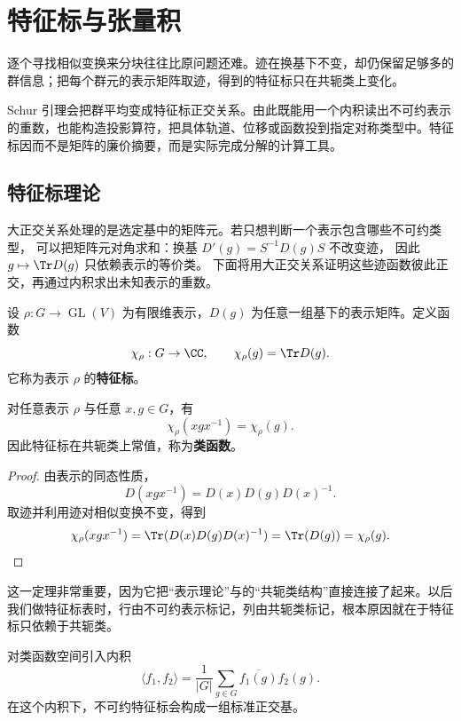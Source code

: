 \chapter{特征标与张量积}
\label{chap:characters-projections}

逐个寻找相似变换来分块往往比原问题还难。迹在换基下不变，却仍保留足够多的群信息；把每个群元的表示矩阵取迹，得到的特征标只在共轭类上变化。

Schur 引理会把群平均变成特征标正交关系。由此既能用一个内积读出不可约表示的重数，也能构造投影算符，把具体轨道、位移或函数投到指定对称类型中。特征标因而不是矩阵的廉价摘要，而是实际完成分解的计算工具。

\section{特征标理论}
\label{sec:character-theory}

大正交关系处理的是选定基中的矩阵元。若只想判断一个表示包含哪些不可约类型，
可以把矩阵元对角求和：换基 $D'(g)=S^{-1}D(g)S$ 不改变迹，
因此 $g\mapsto\Tr D(g)$ 只依赖表示的等价类。
下面将用大正交关系证明这些迹函数彼此正交，再通过内积求出未知表示的重数。

\begin{definition}[特征标]
设 $\rho:G\to\operatorname{GL}(V)$ 为有限维表示，$D(g)$ 为任意一组基下的表示矩阵。定义函数
\[
\chi_\rho:G\to\CC,
\qquad
\chi_\rho(g)=\Tr D(g).
\]
它称为表示 $\rho$ 的\textbf{特征标}。
\label{def:character}
\end{definition}

\begin{proposition}[特征标是类函数]
对任意表示 $\rho$ 与任意 $x,g\in G$，有
\[
\chi_\rho(xgx^{-1})=\chi_\rho(g).
\]
因此特征标在共轭类上常值，称为\textbf{类函数}。
\label{prop:character-class-function}

\end{proposition}

\begin{proof}
由表示的同态性质，
\[
D(xgx^{-1})=D(x)D(g)D(x)^{-1}.
\]
取迹并利用迹对相似变换不变，得到
\[
\chi_\rho(xgx^{-1})=\Tr(D(x)D(g)D(x)^{-1})=\Tr(D(g))=\chi_\rho(g).
\]
\end{proof}

这一定理非常重要，因为它把“表示理论”与的“共轭类结构”直接连接了起来。以后我们做特征标表时，行由不可约表示标记，列由共轭类标记，根本原因就在于特征标只依赖于共轭类。

对类函数空间引入内积
\[
\langle f_1,f_2\rangle
=\frac1{|G|}\sum_{g\in G} \overline{f_1(g)}f_2(g).
\]
在这个内积下，不可约特征标会构成一组标准正交基。

